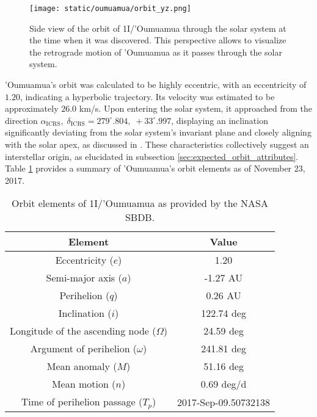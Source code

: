 \begin{figure}[H]
  \centering
  \texttt{[image: static/oumuamua/orbit\_yz.png]}
  \caption[Side view of the orbit of 1I/'Oumuamua through the solar system]
  {
    Side view of the orbit of 1I/'Oumuamua through the solar system at the time when it was
    discovered. This perspective allows to visualize the retrograde motion of
    'Oumuamua as it passes through the solar system.
  }
  \label{fig:oumuamua_orbit_yz}
\end{figure}

'Oumuamua's orbit was calculated to be highly eccentric, with an eccentricity of
$1.20$, indicating a hyperbolic trajectory. Its velocity was estimated to be
approximately $26.0$ km/s. Upon entering the solar system, it approached from
the direction $\alpha_{\text{ICRS}},\; \delta_{\text{ICRS}} = 279^\circ.804,\;
  +33^\circ.997$, displaying an inclination significantly deviating from the solar
system's invariant plane and closely aligning with the solar apex, as discussed
in \cite{mamajek2017}. These characteristics collectively suggest an
interstellar origin, as elucidated in subsection
\ref{sec:expected_orbit_attributes}. Table \ref{tab:oumuamua_elements} provides
a summary of 'Oumuamua's orbit elements as of November 23, 2017.

\begin{table}[H]
  \centering
  \begin{tabular}{|c|c|}
    \hline
    Element                                    & Value                \\
    \hline
    Eccentricity ($e$)                         & 1.20                 \\
    Semi-major axis ($a$)                      & -1.27 AU             \\
    Perihelion ($q$)                           & 0.26 AU              \\
    Inclination ($i$)                          & 122.74 deg           \\
    Longitude of the ascending node ($\Omega$) & 24.59 deg            \\
    Argument of perihelion ($\omega$)          & 241.81 deg           \\
    Mean anomaly ($M$)                         & 51.16 deg            \\
    Mean motion ($n$)                          & 0.69 deg/d           \\
    Time of perihelion passage ($T_p$)         & 2017-Sep-09.50732138 \\
    \hline
  \end{tabular}
  \caption{Orbit elements of 1I/'Oumuamua as provided by the NASA SBDB.}
  \label{tab:oumuamua_elements}
\end{table}

